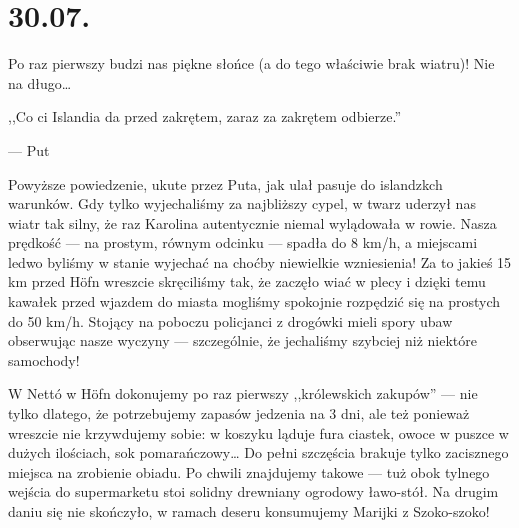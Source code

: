 \chapter*{30.07.}

Po raz pierwszy budzi nas piękne słońce (a do tego właściwie brak wiatru)! Nie na długo…

\epigraph{,,Co ci Islandia da przed zakrętem, zaraz za zakrętem odbierze.''}{--- \textup{Put}}

Powyższe powiedzenie, ukute przez Puta, jak ulał pasuje do islandzkch warunków. Gdy tylko wyjechaliśmy za najbliższy cypel, w twarz uderzył nas wiatr tak silny, że raz Karolina autentycznie niemal wylądowała w rowie. Nasza prędkość --- na prostym, równym odcinku --- spadła do 8 km/h, a miejscami ledwo byliśmy w stanie wyjechać na choćby niewielkie wzniesienia! Za to jakieś 15 km przed Höfn wreszcie skręciliśmy tak, że zaczęło wiać w plecy i dzięki temu kawałek przed wjazdem do miasta mogliśmy spokojnie rozpędzić się na prostych do 50 km/h. Stojący na poboczu policjanci z drogówki mieli spory ubaw obserwując nasze wyczyny --- szczególnie, że jechaliśmy szybciej niż niektóre samochody!



W Nettó w Höfn dokonujemy po raz pierwszy ,,królewskich zakupów'' --- nie tylko dlatego, że potrzebujemy zapasów jedzenia na 3 dni, ale też ponieważ wreszcie nie krzywdujemy sobie: w koszyku ląduje fura ciastek, owoce w puszce w dużych ilościach, sok pomarańczowy… Do pełni szczęścia brakuje tylko zacisznego miejsca na zrobienie obiadu. Po chwili znajdujemy takowe --- tuż obok tylnego wejścia do supermarketu stoi solidny drewniany ogrodowy ławo-stół. Na drugim daniu się nie skończyło, w ramach deseru konsumujemy Marijki z Szoko-szoko!


